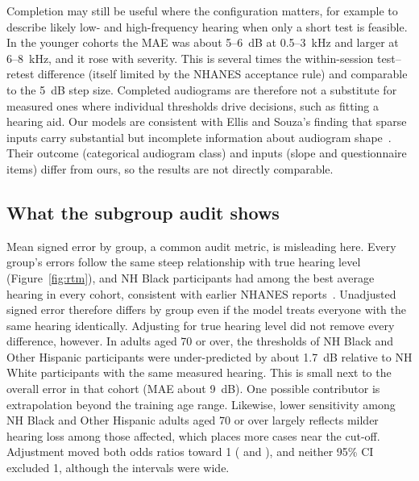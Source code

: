 \documentclass[11pt]{article}
\begin{document}
Completion may still be useful where the configuration matters, for example to describe likely low- and high-frequency hearing when only a short test is feasible. In the younger cohorts the MAE was about 5--6~dB at 0.5--3~kHz and larger at 6--8~kHz, and it rose with severity. This is several times the within-session test--retest difference (itself limited by the NHANES acceptance rule) and comparable to the 5~dB step size. Completed audiograms are therefore not a substitute for measured ones where individual thresholds drive decisions, such as fitting a hearing aid. Our models are consistent with Ellis and Souza's finding that sparse inputs carry substantial but incomplete information about audiogram shape~\cite{ellis2021}. Their outcome (categorical audiogram class) and inputs (slope and questionnaire items) differ from ours, so the results are not directly comparable.

\subsection*{What the subgroup audit shows}
Mean signed error by group, a common audit metric, is misleading here. Every group's errors follow the same steep relationship with true hearing level (Figure~\ref{fig:rtm}), and NH Black participants had among the best average hearing in every cohort, consistent with earlier NHANES reports~\cite{agrawal2008,lin2011older}. Unadjusted signed error therefore differs by group even if the model treats everyone with the same hearing identically. Adjusting for true hearing level did not remove every difference, however. In adults aged 70 or over, the thresholds of NH Black and Other Hispanic participants were under-predicted by about 1.7~dB relative to NH White participants with the same measured hearing. This is small next to the overall error in that cohort (MAE about 9~dB). One possible contributor is extrapolation beyond the training age range. Likewise, lower sensitivity among NH Black and Other Hispanic adults aged 70 or over largely reflects milder hearing loss among those affected, which places more cases near the cut-off. Adjustment moved both odds ratios toward 1 (\OrCondBlackExtB{} and \OrCondOthHispExtB{}), and neither 95\% CI excluded 1, although the intervals were wide.
\end{document}
